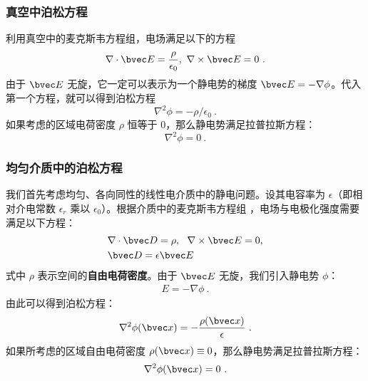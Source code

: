 \subsubsection{真空中泊松方程}
利用真空中的麦克斯韦方程组，电场满足以下的方程
\begin{equation}
\nabla\cdot \bvec E=\frac{\rho}{\epsilon_0},\  \nabla\times \bvec E=0~.
\end{equation}
由于 $\bvec E$ 无旋，它一定可以表示为一个静电势的梯度 $\bvec E=-\nabla \phi$。代入第一个方程，就可以得到泊松方程
\begin{equation}
\nabla^2\phi=-\rho/\epsilon_0~.
\end{equation}
如果考虑的区域电荷密度 $\rho$ 恒等于 $0$，那么静电势满足拉普拉斯方程：
\begin{equation}
\nabla^2\phi=0~.
\end{equation}

\subsubsection{均匀介质中的泊松方程}
我们首先考虑均匀、各向同性的线性电介质中的静电问题。设其电容率为 $\epsilon$（即相对介电常数 $\epsilon_r$ 乘以 $\epsilon_0$）。根据介质中的麦克斯韦方程组 ，电场与电极化强度需要满足以下方程：
\begin{align}
&\nabla \cdot \bvec D = \rho,\ \ \nabla \times \bvec E = 0,\\
&\bvec D=\epsilon \bvec E
\end{align}
式中 $\rho$ 表示空间的\textbf{自由电荷密度}。由于 $\bvec E$ 无旋，我们引入静电势 $\phi$：
\begin{align}
E=-\nabla \phi~.
\end{align}
由此可以得到泊松方程：
\begin{align}
\nabla^2 \phi(\bvec x)=-\frac{\rho(\bvec x)}{\epsilon} \label{eq_EPoiEQ_1}~.
\end{align}
如果所考虑的区域自由电荷密度 $\rho(\bvec x)\equiv 0$，那么静电势满足拉普拉斯方程：
\begin{align}
\nabla^2 \phi(\bvec x)=0~.
\end{align}

